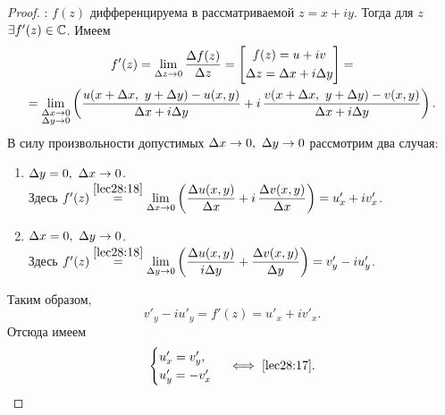 \documentclass[../../main.tex]{subfiles}
\begin{document}
\begin{proof}
	\;

	\nec: $f(z)$ дифференцируема в рассматриваемой $z = x + i y$.
	Тогда для $z$ $\exists f'(z) \in \mathbb{C}$. Имеем
	\begin{equation}
	\label{lec28:18}
	\begin{gathered}
	f'(z) = \lim\limits_{\Delta z \to 0} \frac{\Delta f(z)}{\Delta z} = 
	\left[\begin{gathered}
	f(z) = u + i v \\
	\Delta z = \Delta x + i \Delta y
	\end{gathered}\right] = \\ =
	\lim\limits_{\substack{\Delta x \to 0\\\Delta y \to 0}} \left(
	\frac{u(x + \Delta x,\ y + \Delta y) - u(x, y)}{\Delta x + i \Delta y} +
	i\, \frac{v(x + \Delta x,\ y + \Delta y) - v(x, y)}{\Delta x + i \Delta y}\right).
	\end{gathered}
	\end{equation}
	В силу произвольности допустимых $\Delta x \to 0,\ \Delta y \to 0$
	рассмотрим два случая:
	\begin{enumerate}
	\item $\Delta y = 0,\ \Delta x \to 0$. \\
	Здесь $f'(z) \stk{lec28:18}{=} \lim\limits_{\D x \to 0}
	\left(\dfrac{\D u(x, y)}{\D x} + i\, \dfrac{\D v(x, y)}{\D x}\right) =
	u'_x + i v'_x$.
	\item $\Delta x = 0,\ \Delta y \to 0$. \\
	Здесь $f'(z) \stk{lec28:18}{=} \lim\limits_{\D y \to 0}
	\left(\dfrac{\D u(x, y)}{i \D y} + \dfrac{\D v(x, y)}{\D y}\right) =
	v'_y - i u'_y$.
	\end{enumerate}
	Таким образом,
	\[
	v'_y - i u'_y = f'(z) = u'_x + i v'_x.
	\]
	Отсюда имеем
	\[
	\begin{cases}
		u'_x = v'_y, \\
		u'_y = -v'_x
	\end{cases}
	\iff \eqref{lec28:17}.
	\]
	

\end{proof}
\end{document}
